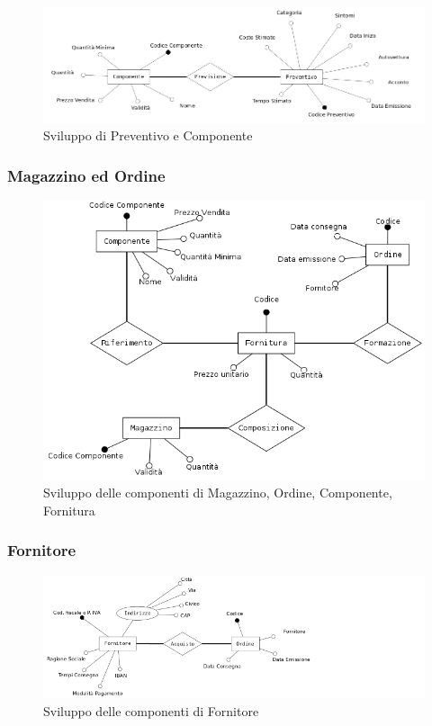 			\begin{figure}[H]
				\centering
				\includegraphics[width=11.5cm]{images/finitures/preventivo_componente.png}
				\caption{Sviluppo di Preventivo e Componente}
				\label{fig:preventivo_componente}
			\end{figure}
		
		\subsubsection{Magazzino ed Ordine}
		
			\begin{figure}[H]
				\centering
				\includegraphics[width=11.5cm]{images/finitures/componente_fornitura_ordine_magazzino.png}
				\caption{Sviluppo delle componenti di Magazzino, Ordine, Componente, Fornitura}
				\label{fig:componente_fornitura_ordine_magazzino}
			\end{figure}
		
		\subsubsection{Fornitore}
			
			\begin{figure}[H]
				\centering
				\includegraphics[width=11.5cm]{images/finitures/ordine_fornitore.png}
				\caption{Sviluppo delle componenti di Fornitore}
				\label{fig:ordine_fornitore}
			\end{figure}
			

